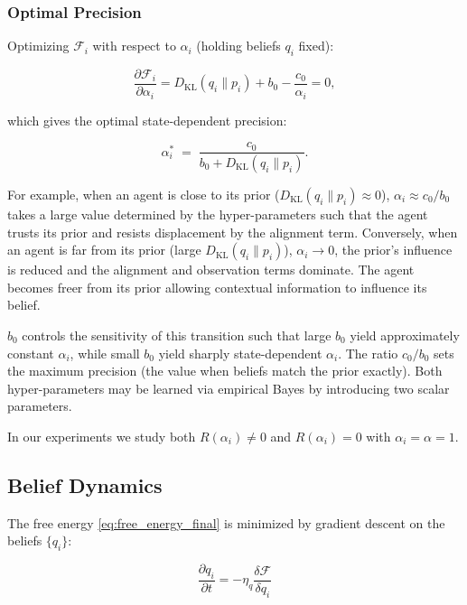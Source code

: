 \documentclass[twoside,11pt]{article}
\begin{document}
\subsubsection{Optimal Precision}

Optimizing $\mathcal{F}_i$ with respect to $\alpha_i$ (holding beliefs $q_i$ fixed):

\begin{equation}
\frac{\partial \mathcal{F}_i}{\partial \alpha_i}
= D_{\mathrm{KL}}(q_i \| p_i) + b_0 - \frac{c_0}{\alpha_i} = 0,
\end{equation}

which gives the optimal state-dependent precision:

\begin{equation}
\boxed{
\alpha_i^*
\;=\; \frac{c_0}{b_0 + D_{\mathrm{KL}}(q_i \| p_i)}.
}
\label{eq:state_dependent_alpha}
\end{equation}

For example, when an agent is close to its prior ($D_{\mathrm{KL}}(q_i \| p_i) \approx 0$), $\alpha_i \approx c_0/b_0$ takes a large value determined by the hyper-parameters such that the agent trusts its prior and resists displacement by the alignment term. Conversely, when an agent is far from its prior (large $D_{\mathrm{KL}}(q_i \| p_i)$), $\alpha_i \to 0$,  the prior's influence is reduced and the alignment and observation terms dominate. The agent becomes freer from its prior allowing contextual information to influence its belief.

$b_0$ controls the sensitivity of this transition such that large $b_0$ yield approximately constant $\alpha_i$, while small $b_0$ yield sharply state-dependent $\alpha_i$. The ratio $c_0/b_0$ sets the maximum precision (the value when beliefs match the prior exactly). Both hyper-parameters may be learned via empirical Bayes by introducing two scalar parameters.

In our experiments we study both $R(\alpha_i) \neq 0$ and $R(\alpha_i) = 0$ with $\alpha_i = \alpha = 1$.


\subsection{Belief Dynamics}

The free energy \eqref{eq:free_energy_final} is minimized by gradient descent on the beliefs $\{q_i\}$:

\begin{equation}
\frac{\partial q_i}{\partial t} = -\eta_q \frac{\delta \mathcal{F}}{\delta q_i}
\label{eq:belief_dynamics}
\end{equation}
\end{document}
